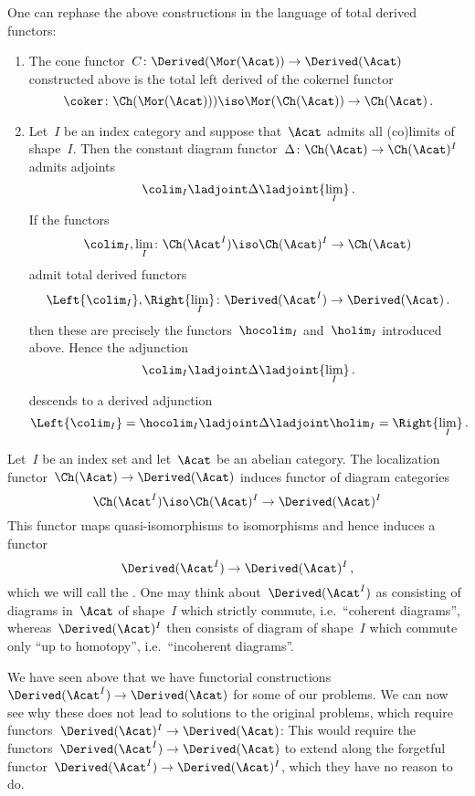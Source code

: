 \documentclass[a4paper,10pt]{scrartcl}
\begin{document}
One can rephase the above constructions in the language of total derived functors:
\pagebreak
\begin{example}
  \leavevmode
  \begin{enumerate}
    \item
      The cone functor~$C \colon \Derived(\Mor(\Acat)) \to \Derived(\Acat)$ constructed above is the total left derived of the cokernel functor
      \[
        \coker
        \colon
        \Ch(\Mor(\Acat)))
        \iso
        \Mor(\Ch(\Acat))
        \to
        \Ch(\Acat) \,.
      \]
    \item
      Let~$I$ be an index category and suppose that~$\Acat$ admits all (co)limits of shape~$I$.
      Then the constant diagram functor~$\Delta \colon \Ch(\Acat) \to \Ch(\Acat)^I$ admits adjoints
      \[
        {\colim_I}
        \ladjoint
        \Delta
        \ladjoint
        {\lim_I} \,.
      \]
      If the functors
      \[
        \colim_I, \lim_I
        \colon
        \Ch(\Acat^I)
        \iso
        \Ch(\Acat)^I
        \to
        \Ch(\Acat)
      \]
      admit total derived functors
      \[
        \Left {\colim_I},
        \Right {\lim_I}
        \colon
        \Derived(\Acat^I)
        \to
        \Derived(\Acat) \,.
      \]
      then these are precisely the functors~$\hocolim_I$ and~$\holim_I$ introduced above.
      Hence the adjunction
      \[
        {\colim_I}
        \ladjoint
        \Delta
        \ladjoint
        {\lim_I} \,.
      \]
      descends to a derived adjunction
      \[
        \Left {\colim_I}
        =
        \hocolim_I
        \ladjoint
        \Delta
        \ladjoint
        \holim_I
        =
        \Right {\lim_I} \,.
      \]
  \end{enumerate}
\end{example}


\begin{remark}
  Let~$I$ be an index set and let~$\Acat$ be an abelian category.
  The localization functor~$\Ch(\Acat) \to \Derived(\Acat)$ induces functor of diagram categories
  \[
    \Ch(\Acat^I)
    \iso
    \Ch(\Acat)^I
    \to
    \Derived(\Acat)^I
  \]
  This functor maps quasi-isomorphisms to isomorphisms and hence induces a functor
  \[
    \Derived(\Acat^I) \to \Derived(\Acat)^I \,,
  \]
  which we will call the .
  One may think about~$\Derived(\Acat^I)$ as consisting of diagrams in~$\Acat$ of shape~$I$ which strictly commute, i.e.\ \enquote{coherent diagrams}, whereas~$\Derived(\Acat)^I$ then consists of diagram of shape~$I$ which commute only \enquote{up to homotopy}, i.e.\ \enquote{incoherent diagrams}.
  
  We have seen above that we have functorial constructions~$\Derived(\Acat^I) \to \Derived(\Acat)$ for some of our problems.
  We can now see why these does not lead to solutions to the original problems, which require functors~$\Derived(\Acat)^I \to \Derived(\Acat)$:
  This would require the functors~$\Derived(\Acat^I) \to \Derived(\Acat)$ to extend along the forgetful functor~$\Derived(\Acat^I) \to \Derived(\Acat)^I$, which they have no reason to do.
\end{remark}
\end{document}
